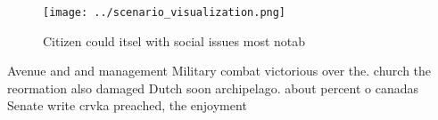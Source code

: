 \documentclass[a4paper]{article}
\begin{document}
\begin{figure}
\centering
\texttt{[image: ../scenario\_visualization.png]}
\caption{Citizen could itsel with social issues most notab
}
\end{figure}
 
Avenue and and management Military combat victorious over the. church the reormation also damaged Dutch soon archipelago. about percent o canadas Senate write crvka preached, the enjoyment 
\end{document}
